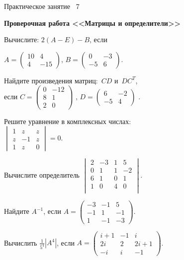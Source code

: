 \documentclass[a5paper,17pt]{extarticle}
\begin{document}
\begin{enumerate}
{\item[]\centering \small Практическое занятие \textnumero~7 
\par\bfseries  Проверочная работа <<Матрицы и определители>>\par}
\item Вычислите: $2(A-E)-B$, если

$A=\begin{pmatrix}10&4\\4&-15\end{pmatrix}$,
$B=\begin{pmatrix}0&-3\\-5&6\end{pmatrix}$.

\item Найдите произведения матриц:~$CD$ и~$DC^T$,\\ если
$C=\begin{pmatrix}0&-12\\ 8 & 1 \\2 & 0 \end{pmatrix}$ , 
$D=\begin{pmatrix}6&-2\\-5&4\end{pmatrix}$ .

\item Решите уравнение в комплексных числах: \\
$\begin{vmatrix}
1 & z & z \\
z & -1 & z \\
1 & z & 0 
\end{vmatrix}=0$.

\item Вычислите определитель $
\begin{vmatrix}
2 & -3 & 1 & 5\\
0 & 1 & 1 & -2\\
6 & 1 & 0 & 1\\
1 & 0 & 4 & 0\\
\end{vmatrix}.
$

\item Найдите $A^{-1}$, если
$A=\begin{pmatrix}-3 & -1 & 5\\ -1 & 1 & -1\\ 1 & -1 & -3\end{pmatrix}$.

\item Вычислить $\frac{1}{5^4}\left|A^{4}\right|$, если $A=\begin{pmatrix}i+1 & -1 & i\\ 2i & 2 & 2i+1\\ -i & i & -1\end{pmatrix}$.

\end{enumerate}
\newpage
\end{document}
